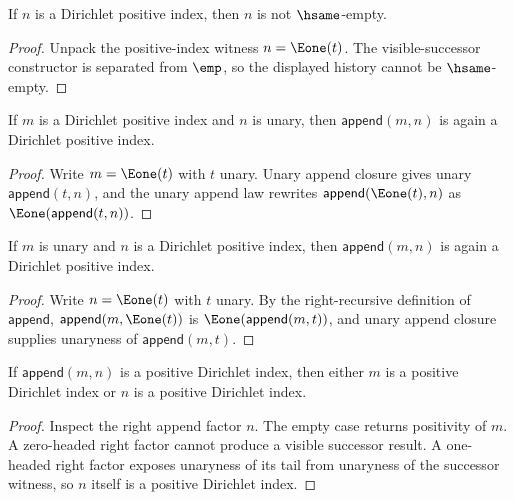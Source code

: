 \begin{theorem}
\label{thm:dirichlet-positive-index-nonempty}
If \(n\) is a Dirichlet positive index, then \(n\) is not \(\hsame\)-empty.
\end{theorem}
\begin{proof}
Unpack the positive-index witness \(n=\Eone(t)\). The visible-successor
constructor is separated from \(\emp\), so the displayed history cannot be
\(\hsame\)-empty.
\end{proof}

\begin{lemma}
\label{lem:dirichlet-positive-index-append-unary-closed}
If \(m\) is a Dirichlet positive index and \(n\) is unary, then
\(\mathsf{append}(m,n)\) is again a Dirichlet positive index.
\end{lemma}
\begin{proof}
Write \(m=\Eone(t)\) with \(t\) unary. Unary append closure gives unary
\(\mathsf{append}(t,n)\), and the unary append law rewrites
\(\mathsf{append}(\Eone(t),n)\) as \(\Eone(\mathsf{append}(t,n))\).
\end{proof}

\begin{theorem}
\label{thm:dirichlet-positive-index-prepend-unary-closed}
If \(m\) is unary and \(n\) is a Dirichlet positive index, then
\(\mathsf{append}(m,n)\) is again a Dirichlet positive index.
\end{theorem}
\begin{proof}
Write \(n=\Eone(t)\) with \(t\) unary. By the right-recursive definition of
\(\mathsf{append}\), \(\mathsf{append}(m,\Eone(t))\) is
\(\Eone(\mathsf{append}(m,t))\), and unary append closure supplies unaryness
of \(\mathsf{append}(m,t)\).
\end{proof}

\begin{lemma}
\label{lem:dirichlet-positive-index-append-right-cases}
If \(\mathsf{append}(m,n)\) is a positive Dirichlet index, then either \(m\)
is a positive Dirichlet index or \(n\) is a positive Dirichlet index.
\end{lemma}
\begin{proof}
Inspect the right append factor \(n\). The empty case returns positivity of
\(m\). A zero-headed right factor cannot produce a visible successor result.
A one-headed right factor exposes unaryness of its tail from unaryness of the
successor witness, so \(n\) itself is a positive Dirichlet index.
\end{proof}

